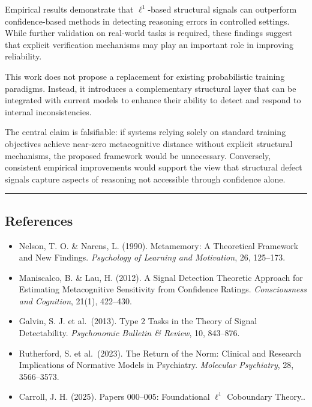 \documentclass[
]{article}
\providecommand{\tightlist}{%
  \setlength{\itemsep}{0pt}\setlength{\parskip}{0pt}}
\begin{document}
Empirical results demonstrate that \(\ell^1\)-based structural signals
can outperform confidence-based methods in detecting reasoning errors in
controlled settings. While further validation on real-world tasks is
required, these findings suggest that explicit verification mechanisms
may play an important role in improving reliability.

This work does not propose a replacement for existing probabilistic
training paradigms. Instead, it introduces a complementary structural
layer that can be integrated with current models to enhance their
ability to detect and respond to internal inconsistencies.

The central claim is falsifiable: if systems relying solely on standard
training objectives achieve near-zero metacognitive distance without
explicit structural mechanisms, the proposed framework would be
unnecessary. Conversely, consistent empirical improvements would support
the view that structural defect signals capture aspects of reasoning not
accessible through confidence alone.

\begin{center}\rule{0.5\linewidth}{0.5pt}\end{center}

\subsection{References}\label{references}

\begin{itemize}
\tightlist
\item
  Nelson, T. O. \& Narens, L. (1990). Metamemory: A Theoretical
  Framework and New Findings. \emph{Psychology of Learning and
  Motivation}, 26, 125--173.
\item
  Maniscalco, B. \& Lau, H. (2012). A Signal Detection Theoretic
  Approach for Estimating Metacognitive Sensitivity from Confidence
  Ratings. \emph{Consciousness and Cognition}, 21(1), 422--430.
\item
  Galvin, S. J. et al.~(2013). Type 2 Tasks in the Theory of Signal
  Detectability. \emph{Psychonomic Bulletin \& Review}, 10, 843--876.
\item
  Rutherford, S. et al.~(2023). The Return of the Norm: Clinical and
  Research Implications of Normative Models in Psychiatry.
  \emph{Molecular Psychiatry}, 28, 3566--3573.
\item
  Carroll, J. H. (2025). Papers 000--005: Foundational \(\ell^1\)
  Coboundary Theory..
\end{itemize}
\end{document}

